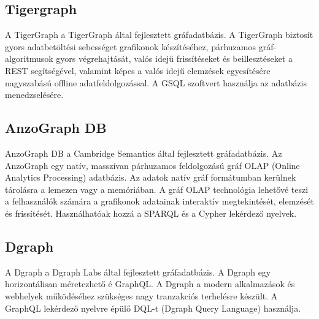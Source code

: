 \subsection{Tigergraph}
A TigerGraph a TigerGraph által fejlesztett gráfadatbázis. \cite{tigergraph} A TigerGraph biztosít gyors adatbetöltési sebességet grafikonok készítéséhez, párhuzamos gráf-algoritmusok gyors végrehajtását, valós idejű frissítéseket és beillesztéseket a REST segítségével, valamint képes a valós idejű elemzések egyesítésére nagyszabású offline adatfeldolgozással. A GSQL szoftvert használja az adatbázis menedzselésére.

\subsection{AnzoGraph DB}
AnzoGraph DB a Cambridge Semantics által fejlesztett gráfadatbázis. Az AnzoGraph egy natív, masszívan párhuzamos feldolgozású gráf  OLAP (Online Analytics Processing) adatbázis. \cite{anzograph1} \cite{anzograph2} Az adatok natív gráf formátumban kerülnek tárolásra a lemezen vagy a memóriában. A gráf  OLAP technológia lehetővé teszi a felhasználók számára a grafikonok adatainak interaktív megtekintését, elemzését és frissítését. Használhatóak hozzá a SPARQL és a Cypher lekérdező nyelvek.

\subsection{Dgraph}
A Dgraph a Dgraph Labs által fejlesztett gráfadatbázis. \cite{dgraph} A Dgraph egy horizontálisan méretezhető é GraphQL. A Dgraph a modern alkalmazások és webhelyek működéséhez szükséges nagy tranzakciós terhelésre készült. A GraphQL lekérdező nyelvre épülő DQL-t (Dgraph Query Language) használja.
